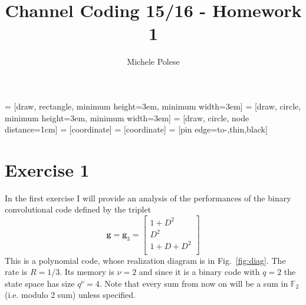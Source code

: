 \documentclass[10pt]{article}
\begin{document}
\title{Channel Coding 15/16 - Homework 1}
\author{Michele Polese}

\maketitle

 = [draw, rectangle, 
    minimum height=3em, minimum width=3em]
 = [draw, circle, minimum height=3em, minimum width=3em]
 = [draw, circle, node distance=1cm]
 = [coordinate]
 = [coordinate]
 = [pin edge={to-,thin,black}]


\section*{Exercise 1}
In the first exercise I will provide an analysis of the performances of the binary convolutional code defined by the triplet 
\begin{equation}
	\mathbf{g} = \mathbf{g}_3 = \begin{bmatrix}
			1 + D^2 \\
			D^2	\\
			1 + D + D^2 \\
			\end{bmatrix}
\end{equation}
This is a polynomial code, whose realization diagram is in Fig.~\ref{fig:diag}. The rate is $R = 1/3$. Its memory is $\nu = 2$ and since it is a binary code with $q = 2$ the state space has size $q^\nu = 4$. Note that every sum from now on will be a sum in $\mathbb{F}_2$ (i.e. modulo 2 sum) unless specified.
\end{document}
